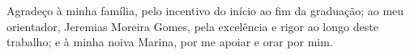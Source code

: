 Agradeço à minha família, pelo incentivo do início ao fim da graduação; ao meu orientador,
Jeremias Moreira Gomes, pela excelência e rigor ao longo deste trabalho; e à minha noiva Marina, por me apoiar e orar por mim.
